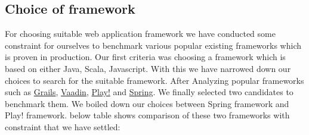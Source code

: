 \subsection{Choice of framework}
For choosing suitable web application framework we have conducted some  constraint for ourselves to benchmark various popular existing frameworks which is proven in production. Our first criteria was choosing a framework which is based on either Java, Scala, Javascript. With this we have narrowed down our choices to search for the suitable framework. After Analyzing popular frameworks such as \href{https://grails.org/}{Grails}, \href{https://vaadin.com/home}{Vaadin}, \href{https://www.playframework.com/}{Play!} and \href{http://projects.spring.io/spring-framework/}{Spring}. We finally selected two candidates to benchmark them. We boiled down our choices between Spring framework and Play! framework. below table shows comparison of these two frameworks with constraint that we have settled:\\\\

